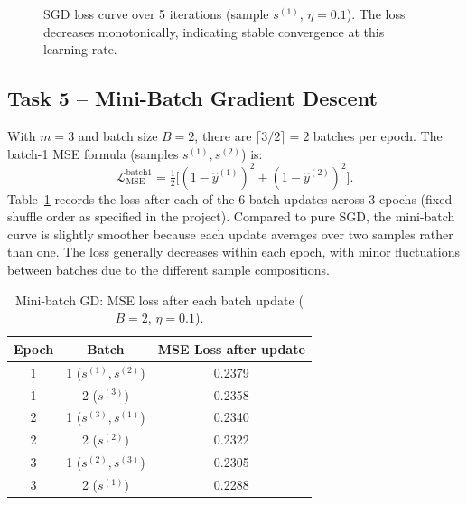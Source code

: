 \documentclass[runningheads]{llncs}
\begin{document}
\begin{figure}[h]
\centering
{}
\caption{SGD loss curve over 5 iterations (sample $s^{(1)}$, $\eta=0.1$).
The loss decreases monotonically, indicating stable convergence at this
learning rate.}
\label{fig:loss4c}
\end{figure}

\subsection{Task 5 -- Mini-Batch Gradient Descent}

With $m=3$ and batch size $B=2$, there are $\lceil 3/2\rceil = 2$ batches per
epoch. The batch-1 MSE formula (samples $s^{(1)},s^{(2)}$) is:
\[
  \mathcal{L}_{\text{MSE}}^{\text{batch1}}
  = \tfrac{1}{2}\bigl[(1-\hat{y}^{(1)})^2 + (1-\hat{y}^{(2)})^2\bigr].
\]
Table~\ref{tab:minibatch} records the loss after each of the 6 batch updates
across 3 epochs (fixed shuffle order as specified in the project). Compared to
pure SGD, the mini-batch curve is slightly smoother because each update
averages over two samples rather than one. The loss generally decreases within
each epoch, with minor fluctuations between batches due to the different sample
compositions.

\begin{table}[h]
\centering
\caption{Mini-batch GD: MSE loss after each batch update ($B=2$, $\eta=0.1$).}
\label{tab:minibatch}
\begin{tabular}{ccc}
\toprule
Epoch & Batch & MSE Loss after update\\
\midrule
1 & 1 ($s^{(1)},s^{(2)}$) & 0.2379\\
1 & 2 ($s^{(3)}$)          & 0.2358\\
2 & 1 ($s^{(3)},s^{(1)}$) & 0.2340\\
2 & 2 ($s^{(2)}$)          & 0.2322\\
3 & 1 ($s^{(2)},s^{(3)}$) & 0.2305\\
3 & 2 ($s^{(1)}$)          & 0.2288\\
\bottomrule
\end{tabular}
\end{table}
\end{document}
